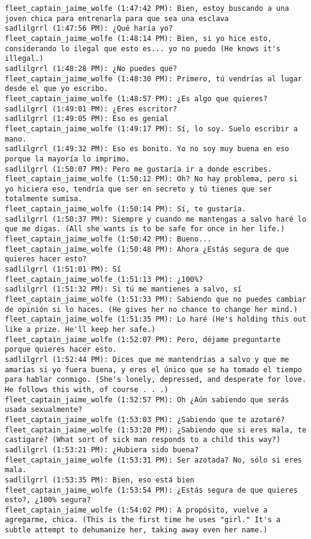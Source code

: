\begin{verbatim}
fleet_captain_jaime_wolfe (1:47:42 PM): Bien, estoy buscando a una joven chica para entrenarla para que sea una esclava
sadlilgrrl (1:47:56 PM): ¿Qué haría yo?
fleet_captain_jaime_wolfe (1:48:14 PM): Bien, si yo hice esto, considerando lo ilegal que esto es... yo no puedo (He knows it's illegal.)
sadlilgrrl (1:48:28 PM): ¿No puedes qué?
fleet_captain_jaime_wolfe (1:48:30 PM): Primero, tú vendrías al lugar desde el que yo escribo.
fleet_captain_jaime_wolfe (1:48:57 PM): ¿Es algo que quieres?
sadlilgrrl (1:49:01 PM): ¿Eres escritor?
sadlilgrrl (1:49:05 PM): Eso es genial
fleet_captain_jaime_wolfe (1:49:17 PM): Sí, lo soy. Suelo escribir a mano.
sadlilgrrl (1:49:32 PM): Eso es bonito. Yo no soy muy buena en eso porque la mayoría lo imprimo.
sadlilgrrl (1:50:07 PM): Pero me gustaría ir a donde escribes.
fleet_captain_jaime_wolfe (1:50:12 PM): Oh? No hay problema, pero si yo hiciera eso, tendría que ser en secreto y tú tienes que ser totalmente sumisa.
fleet_captain_jaime_wolfe (1:50:14 PM): Sí, te gustaría.
sadlilgrrl (1:50:37 PM): Siempre y cuando me mantengas a salvo haré lo que me digas. (All she wants is to be safe for once in her life.)
fleet_captain_jaime_wolfe (1:50:42 PM): Bueno...
fleet_captain_jaime_wolfe (1:50:48 PM): Ahora ¿Estás segura de que quieres hacer esto?
sadlilgrrl (1:51:01 PM): Sí
fleet_captain_jaime_wolfe (1:51:13 PM): ¿100%?
sadlilgrrl (1:51:32 PM): Si tú me mantienes a salvo, sí
fleet_captain_jaime_wolfe (1:51:33 PM): Sabiendo que no puedes cambiar de opinión si lo haces. (He gives her no chance to change her mind.)
fleet_captain_jaime_wolfe (1:51:35 PM): Lo haré (He's holding this out like a prize. He'll keep her safe.)
fleet_captain_jaime_wolfe (1:52:07 PM): Pero, déjame preguntarte porque quieres hacer esto.
sadlilgrrl (1:52:44 PM): Dices que me mantendrías a salvo y que me amarías si yo fuera buena, y eres el único que se ha tomado el tiempo para hablar conmigo. (She's lonely, depressed, and desperate for love. He follows this with, of course . . .)
fleet_captain_jaime_wolfe (1:52:57 PM): Oh ¿Aún sabiendo que serás usada sexualmente?
fleet_captain_jaime_wolfe (1:53:03 PM): ¿Sabiendo que te azotaré?
fleet_captain_jaime_wolfe (1:53:20 PM): ¿Sabiendo que si eres mala, te castigaré? (What sort of sick man responds to a child this way?)
sadlilgrrl (1:53:21 PM): ¿Hubiera sido buena?
fleet_captain_jaime_wolfe (1:53:31 PM): Ser azotada? No, sólo si eres mala.
sadlilgrrl (1:53:35 PM): Bien, eso está bien
fleet_captain_jaime_wolfe (1:53:54 PM): ¿Estás segura de que quieres esto?, ¿100% segura?
fleet_captain_jaime_wolfe (1:54:02 PM): A propósito, vuelve a agregarme, chica. (This is the first time he uses "girl." It's a subtle attempt to dehumanize her, taking away even her name.)

\end{verbatim}
